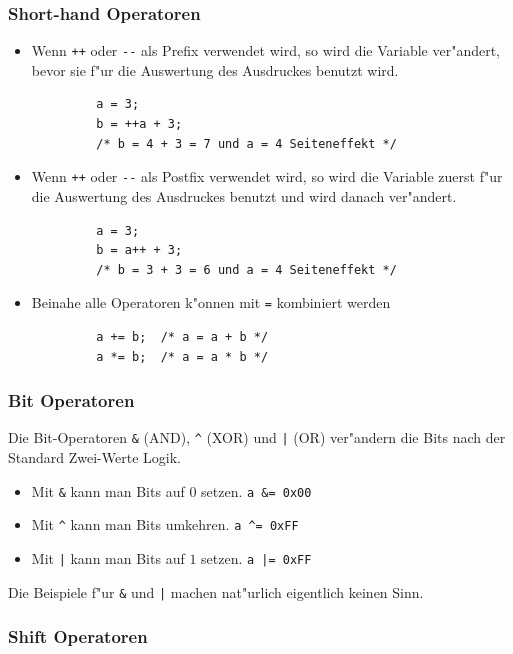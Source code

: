 \documentclass[german, 10pt, a4paper, twocolumn]{scrartcl}
\begin{document}
\subsubsection{Short-hand Operatoren}

\begin{itemize}
	\item Wenn \verb#++# oder \verb#--# als Prefix verwendet wird, so wird die Variable ver"andert, bevor sie f"ur die Auswertung des Ausdruckes benutzt wird.
		\begin{verbatim}
		 a = 3;
		 b = ++a + 3;
		 /* b = 4 + 3 = 7 und a = 4 Seiteneffekt */
		\end{verbatim}
	\item Wenn \verb#++# oder \verb#--# als Postfix verwendet wird, so wird die Variable zuerst f"ur die Auswertung des Ausdruckes benutzt und wird danach ver"andert.
		\begin{verbatim}
		 a = 3;
		 b = a++ + 3;
		 /* b = 3 + 3 = 6 und a = 4 Seiteneffekt */
		\end{verbatim}
	\item Beinahe alle Operatoren k"onnen mit \verb#=# kombiniert werden
		\begin{verbatim}
		 a += b;  /* a = a + b */
		 a *= b;  /* a = a * b */
		\end{verbatim}
\end{itemize}

\subsubsection{Bit Operatoren}

Die Bit-Operatoren \verb#&# (AND), \verb#^# (XOR) und \verb#|# (OR) ver"andern die Bits nach der Standard Zwei-Werte Logik.

\begin{itemize}
	\item Mit \verb#&# kann man Bits auf $0$ setzen. \verb#a &= 0x00#
	\item Mit \verb#^# kann man Bits umkehren. \verb#a ^= 0xFF#
	\item Mit \verb#|# kann man Bits auf $1$ setzen. \verb#a |= 0xFF#
\end{itemize}

Die Beispiele f"ur \verb#&# und \verb#|# machen nat"urlich eigentlich keinen Sinn.

\subsubsection{Shift Operatoren}
\end{document}
